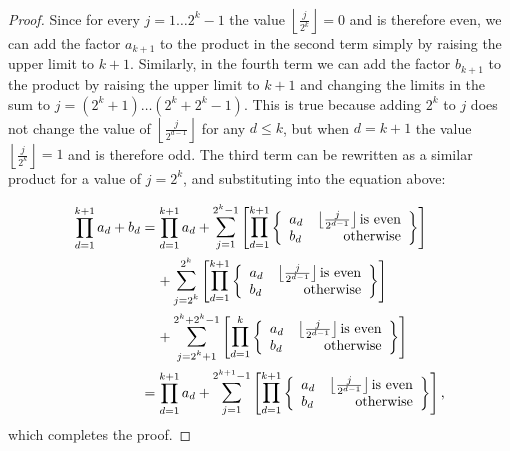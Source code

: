 \documentclass[11pt,a4paper]{tesis}
\theoremstyle{plain}
\theoremstyle{definition}
\begin{document}
\begin{proof}
  Since for every $j = 1 \dots 2^{k} - 1$ the value $\left \lfloor \frac{j}{2^{k}} \right \rfloor = 0$ and is therefore even, we can add the factor $a_{k + 1}$ to the product in the second term simply by raising the upper limit to $k + 1$. Similarly, in the fourth term we can add the factor $b_{k + 1}$ to the product by raising the upper limit to $k + 1$ and changing the limits in the sum to $j = (2^k + 1) \dots (2^k + 2^k - 1)$. This is true because adding $2^k$ to $j$ does not change the value of $\left \lfloor \frac{j}{2^{d - 1}} \right \rfloor$ for any $d \le k$, but when $d = k + 1$ the value $\left \lfloor \frac{j}{2^{k}} \right \rfloor = 1$ and is therefore odd. The third term can be rewritten as a similar product for a value of $j = 2^k$, and substituting into the equation above:

  \begin{equation*}
    \begin{aligned}
      \prod_{d = 1}^{k + 1} a_d + b_d
        & = \prod_{d = 1}^{k + 1} a_d + \mathlarger{\sum}_{j = 1}^{2^k - 1} \left [ \mathlarger{\prod}_{d = 1}^{k + 1}
        \left \{ \begin{array}{lr}
          a_d & \left \lfloor \frac{j}{2^{d - 1}} \right \rfloor \text{is even} \\
          b_d & \text{otherwise}
        \end{array} \right \} \right ] \\
        & \hspace*{4mm} + \mathlarger{\sum}_{j = 2^k}^{2^k} \left [ \mathlarger{\prod}_{d = 1}^{k + 1}
        \left \{ \begin{array}{lr}
          a_d & \left \lfloor \frac{j}{2^{d - 1}} \right \rfloor \text{is even} \\
          b_d & \text{otherwise}
        \end{array} \right \} \right ] \\
        & \hspace*{4mm} + \mathlarger{\sum}_{j = 2^k + 1}^{2^k + 2^k - 1} \left [ \mathlarger{\prod}_{d = 1}^{k}
        \left \{ \begin{array}{lr}
          a_d & \left \lfloor \frac{j}{2^{d - 1}} \right \rfloor \text{is even} \\
          b_d & \text{otherwise}
        \end{array} \right \} \right ] \\
        & = \prod_{d = 1}^{k + 1} a_d + \mathlarger{\sum}_{j = 1}^{2^{k + 1} - 1} \left [ \mathlarger{\prod}_{d = 1}^{k + 1}
        \left \{ \begin{array}{lr}
          a_d & \left \lfloor \frac{j}{2^{d - 1}} \right \rfloor \text{is even} \\
          b_d & \text{otherwise}
        \end{array} \right \} \right ] \text{,}
    \end{aligned}
  \end{equation*}
  which completes the proof.

\end{proof}
\end{document}
